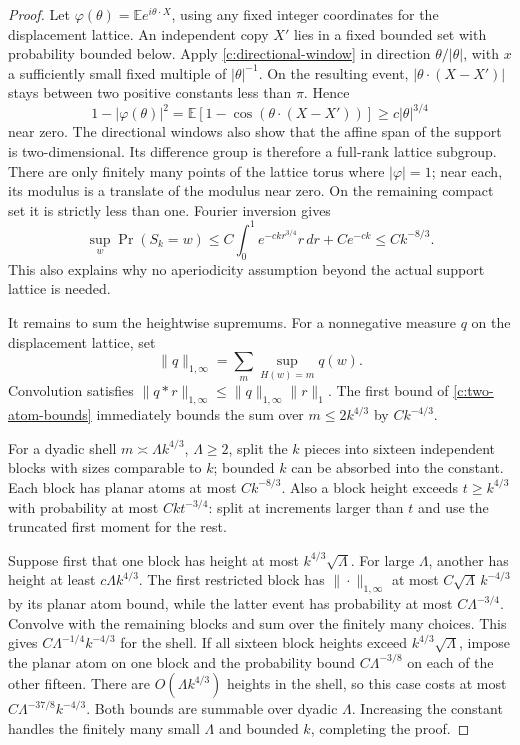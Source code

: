 \documentclass[11pt]{article}
\numberwithin{equation}{section}
\theoremstyle{definition}\newtheorem{definition}[theorem]{Definition}
\theoremstyle{remark}\newtheorem{remark}[theorem]{Remark}
\begin{document}
\begin{proof}
Let $\varphi(\theta)=\mathbb E e^{i\theta\cdot X}$, using any fixed
integer coordinates for the displacement lattice.  An independent copy
$X'$ lies in a fixed bounded set with probability bounded below.  Apply
\eqref{c:directional-window} in direction $\theta/|\theta|$, with
$x$ a sufficiently small fixed multiple of $|\theta|^{-1}$.  On the
resulting event, $|\theta\cdot(X-X')|$ stays between two positive
constants less than $\pi$.  Hence
\[
 1-|\varphi(\theta)|^2
 =\mathbb E[1-\cos(\theta\cdot(X-X'))]
 \ge c|\theta|^{3/4}
\]
near zero.  The directional windows also show that the affine span of the
support is two-dimensional.  Its difference group is therefore a
full-rank lattice subgroup.  There are only finitely many points of the
lattice torus where $|\varphi|=1$; near each, its modulus is a translate
of the modulus near zero.  On the remaining compact set it is strictly
less than one.  Fourier inversion gives
\[
 \sup_w\Pr(S_k=w)
 \le C\int_0^1 e^{-ckr^{3/4}}r\,dr+Ce^{-ck}
 \le Ck^{-8/3}.
\]
This also explains why no aperiodicity assumption beyond the actual
support lattice is needed.

It remains to sum the heightwise supremums.  For a nonnegative measure
$q$ on the displacement lattice, set
\[
 \|q\|_{1,\infty}
 =\sum_m\sup_{H(w)=m}q(w).
\]
Convolution satisfies
$\|q*r\|_{1,\infty}\le\|q\|_{1,\infty}\|r\|_1$.
The first bound of \eqref{c:two-atom-bounds} immediately bounds the sum
over $m\le2k^{4/3}$ by $Ck^{-4/3}$.

For a dyadic shell $m\asymp\Lambda k^{4/3}$, $\Lambda\ge2$, split the $k$ pieces
into sixteen independent blocks with sizes comparable to $k$; bounded
$k$ can be absorbed into the constant.  Each block has planar atoms at
most $Ck^{-8/3}$.  Also a block height exceeds $t\ge k^{4/3}$ with
probability at most $Ckt^{-3/4}$: split at increments larger than $t$
and use the truncated first moment for the rest.

Suppose first that one block has height at most $k^{4/3}\sqrt\Lambda$.
For large $\Lambda$, another has height at least $c\Lambda k^{4/3}$.  The first
restricted block has $\|\cdot\|_{1,\infty}$ at most
$C\sqrt\Lambda\,k^{-4/3}$ by its planar atom bound, while the latter event
has probability at most $C\Lambda^{-3/4}$.  Convolve with the remaining blocks
and sum over the finitely many choices.  This gives
$C\Lambda^{-1/4}k^{-4/3}$ for the shell.  If all sixteen block heights exceed
$k^{4/3}\sqrt\Lambda$, impose the planar atom on one block and the probability
bound $C\Lambda^{-3/8}$ on each of the other fifteen.  There are
$O(\Lambda k^{4/3})$ heights in the shell, so this case costs at most
$C\Lambda^{-37/8}k^{-4/3}$.  Both bounds are summable over dyadic $\Lambda$.
Increasing the constant handles the finitely many small $\Lambda$ and bounded
$k$, completing the proof.
\end{proof}
\end{document}
